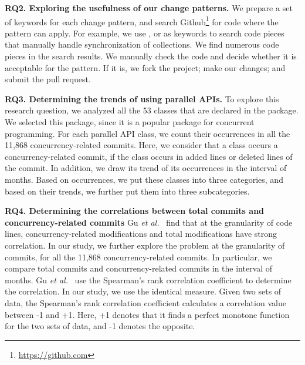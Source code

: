 \textbf{RQ2. Exploring the usefulness of our change patterns.} We prepare a set of keywords for each change pattern, and search Github\footnote{\url{https://github.com}} for code where the pattern can apply. For example, we use ,  or  as keywords to search code pieces that manually handle synchronization of collections. We find numerous code pieces in the search results. We manually check the code and decide whether it is acceptable for the pattern. If it is, we fork the project; make our changes; and submit the pull request.

\textbf{RQ3. Determining the trends of using parallel APIs.} To explore this research question, we analyzed all the 53 classes that are declared in the  package. We selected this package, since it is a popular package for concurrent programming. For each parallel API class, we count their occurrences in all the 11,868 concurrency-related commits. Here, we consider that a class occurs a concurrency-related commit, if the class occurs in added lines or deleted lines of the commit. In addition, we draw its trend of its occurrences in the interval of months. Based on occurrences, we put these classes into three categories, and based on their trends, we further put them into three subcategories.


\textbf{RQ4. Determining the correlations between total commits and concurrency-related commits} Gu \emph{et al.}~\cite{conf/sigsoft/GuJSZL15} find that at the granularity of code lines, concurrency-related modifications and total modifications have strong correlation. In our study, we further explore the problem at the granularity of commits, for all the 11,868 concurrency-related commits. In particular, we compare total commits and concurrency-related commits in the interval of months. Gu \emph{et al.}~\cite{conf/sigsoft/GuJSZL15} use the Spearman's rank correlation coefficient to determine the correlation. In our study, we use the identical measure. Given two sets of data, the Spearman's rank
correlation coefficient calculates a correlation value between -1 and +1. Here, +1 denotes that it finds a perfect monotone function for the two sets of data, and -1 denotes the opposite.





